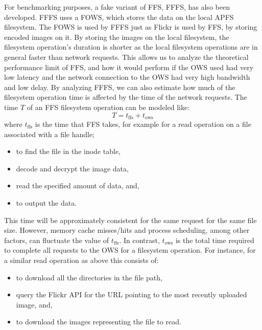 For benchmarking purposes, a fake variant of \gls{FFS}, \gls{FFFS}, has also been developed. \gls{FFFS} uses a \gls{FOWS}, which stores the data on the local \gls{APFS} filesystem. The \gls{FOWS} is used by \gls{FFFS} just as Flickr is used by \gls{FFS}, by storing encoded images on it. By storing the images on the local filesystem, the filesystem operation's duration is shorter as the local filesystem operations are in general faster than network requests. This allows us to analyze the theoretical performance limit of \gls{FFS}, and how it would perform if the \gls{OWS} used had very low latency and the network connection to the \gls{OWS} had very high bandwidth and low delay. By analyzing \gls{FFFS}, we can also estimate how much of the filesystem operation time is affected by the time of the network requests. The time $T$ of an \gls{FFS} filesystem operation can be modeled like:
$$
	T = t_\text{ffs} + t_\text{ows}
$$
where $t_\text{ffs}$ is the time that \gls{FFS} takes, for example for a read operation on a file associated with a file handle;
\begin{itemize}
	\item to find the file in the inode table,
	\item decode and decrypt the image data,
	\item read the specified amount of data, and,
	\item to output the data.
\end{itemize}
This time will be approximately consistent for the same request for the same file size. However, memory cache misses/hits and process scheduling, among other factors, can fluctuate the value of $t_\text{ffs}$. In contrast, $t_\text{ows}$ is the total time required to complete all requests to the \gls{OWS} for a filesystem operation. For instance, for a similar read operation as above this consists of:
\begin{itemize}
	\item to download all the directories in the file path,
	\item query the Flickr \gls{API} for the URL pointing to the most recently uploaded image, and,
	\item to download the images representing the file to read.
\end{itemize}
